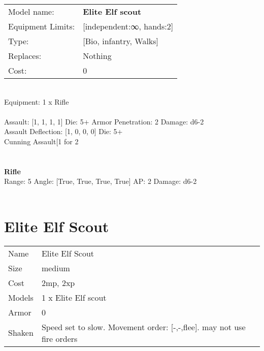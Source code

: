 \noindent
\begin{tabular}{ll}
Model name: &{\bf Elite Elf scout } \\
Equipment Limits: &[independent:∞, hands:2] \\
Type: &[Bio, infantry, Walks] \\
Replaces: &Nothing \\
Cost: & 0\\
\end{tabular}
\ \\
Equipment: 1 x Rifle \\
\ \\
Assault: [1, 1, 1, 1] Die: 5+ Armor Penetration: 2 Damage: d6-2 \\
Assault Deflection: [1, 0, 0, 0] Die: 5+\\
\indent Cunning Assault[1 for 2\\ 
 
\ \\

\ \\
{\bf Rifle } \\



Range: 5  Angle: [True, True, True, True] AP: 2 Damage: d6-2 \\




 
\ \\













\clearpage

\section{ Elite Elf Scout }

\begin{tabular}{ll}
  Name & Elite Elf Scout \\
  Size & medium\\
  Cost & 2mp, 2xp\\
  Models & 1 x Elite Elf scout\\
  Armor & 0\\
  Shaken & Speed set to slow. Movement order: [-,-,flee]. may not use fire orders\\
\end{tabular}

